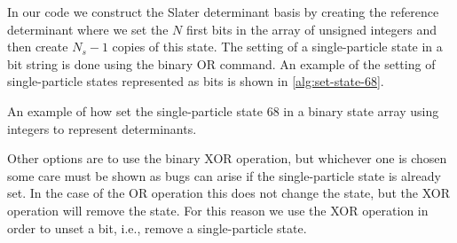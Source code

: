             In our code we construct the Slater determinant basis by creating
            the reference determinant where we set the $N$ first bits in the
            array of unsigned integers and then create $N_s - 1$ copies of this
            state.
            The setting of a single-particle state in a bit string is done using
            the binary OR command.
            An example of the setting of single-particle states represented as
            bits is shown in \autoref{alg:set-state-68}.
            \begin{algorithm}
                \caption{An example of how set the single-particle state $68$ in
                a binary state array  using 
                integers to represent determinants.}
                \label{alg:set-state-68}
            \end{algorithm}
            Other options are to use the binary XOR operation, but whichever one
            is chosen some care must be shown as bugs can arise if the
            single-particle state is already set.
            In the case of the OR operation this does not change the state, but
            the XOR operation will remove the state.
            For this reason we use the XOR operation in order to unset a bit,
            i.e., remove a single-particle state.


